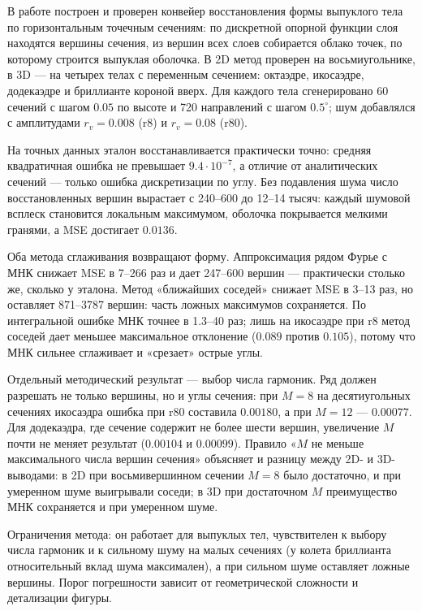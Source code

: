 \documentclass[12pt, a4paper]{article}
\begin{document}
В работе построен и проверен конвейер восстановления формы выпуклого тела по горизонтальным точечным сечениям: по дискретной опорной функции слоя находятся вершины сечения, из вершин всех слоев собирается облако точек, по которому строится выпуклая оболочка. В 2D метод проверен на восьмиугольнике, в 3D --- на четырех телах с переменным сечением: октаэдре, икосаэдре, додекаэдре и бриллианте короной вверх. Для каждого тела сгенерировано 60 сечений с шагом $0.05$ по высоте и 720 направлений с шагом $0.5^\circ$; шум добавлялся с амплитудами $r_v=0.008$ (r8) и $r_v=0.08$ (r80).

На точных данных эталон восстанавливается практически точно: средняя квадратичная ошибка не превышает $9.4\cdot10^{-7}$, а отличие от аналитических сечений --- только ошибка дискретизации по углу. Без подавления шума число восстановленных вершин вырастает с 240--600 до 12--14 тысяч: каждый шумовой всплеск становится локальным максимумом, оболочка покрывается мелкими гранями, а MSE достигает $0.0136$.

Оба метода сглаживания возвращают форму. Аппроксимация рядом Фурье с МНК снижает MSE в 7--266 раз и дает 247--600 вершин --- практически столько же, сколько у эталона. Метод «ближайших соседей» снижает MSE в 3--13 раз, но оставляет 871--3787 вершин: часть ложных максимумов сохраняется. По интегральной ошибке МНК точнее в 1.3--40 раз; лишь на икосаэдре при r8 метод соседей дает меньшее максимальное отклонение ($0.089$ против $0.105$), потому что МНК сильнее сглаживает и «срезает» острые углы.

Отдельный методический результат --- выбор числа гармоник. Ряд должен разрешать не только вершины, но и углы сечения: при $M=8$ на десятиугольных сечениях икосаэдра ошибка при r80 составила $0.00180$, а при $M=12$ --- $0.00077$. Для додекаэдра, где сечение содержит не более шести вершин, увеличение $M$ почти не меняет результат ($0.00104$ и $0.00099$). Правило «$M$ не меньше максимального числа вершин сечения» объясняет и разницу между 2D- и 3D-выводами: в 2D при восьмивершинном сечении $M=8$ было достаточно, и при умеренном шуме выигрывали соседи; в 3D при достаточном $M$ преимущество МНК сохраняется и при умеренном шуме.

Ограничения метода: он работает для выпуклых тел, чувствителен к выбору числа гармоник и к сильному шуму на малых сечениях (у колета бриллианта относительный вклад шума максимален), а при сильном шуме оставляет ложные вершины. Порог погрешности зависит от геометрической сложности и детализации фигуры.
\end{document}
